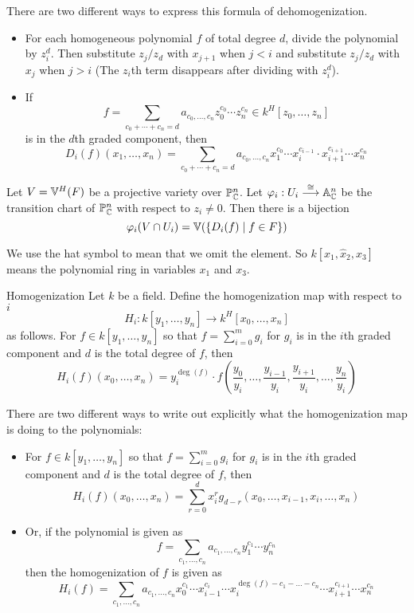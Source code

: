 \documentclass[a4paper]{article}
\begin{document}
There are two different ways to express this formula of dehomogenization. 
\begin{itemize}
\item For each homogeneous polynomial $f$ of total degree $d$, divide the polynomial by $z_i^d$. Then substitute $z_j/z_d$ with $x_{j+1}$ when $j<i$ and substitute $z_j/z_d$ with $x_j$ when $j>i$ (The $z_i$th term disappears after dividing with $z_i^d$). 
\item If $$f=\sum_{c_0+\cdots+c_n=d} a_{c_0,\dots,c_n}z_0^{c_0}\cdots z_n^{c_n}\in k^H[z_0,\dots,z_n]$$ is in the $d$th graded component, then $$D_i(f)(x_1,\dots,x_n)=\sum_{c_0+\cdots+c_n=d} a_{c_0,\dots,c_n}x_1^{c_0}\cdots x_i^{c_{i-1}}\cdot x_{i+1}^{c_{i+1}}\cdots x_n^{c_n}$$
\end{itemize}

\begin{prp}{}{} Let $V=\mathbb{V}^H(F)$ be a projective variety over $\mathbb{P}_{\mathbb{C}}^n$. Let $\varphi_i:U_i\overset{\cong}{\longrightarrow}\mathbb{A}_{\mathbb{C}}^n$ be the transition chart of $\mathbb{P}_{\mathbb{C}}^n$ with respect to $z_i\neq 0$. Then there is a bijection $$\varphi_i(V\cap U_i)=\mathbb{V}(\{D_i(f)\;|\;f\in F\})$$
\end{prp}

We use the hat symbol to mean that we omit the element. So $k[x_1,\hat{x}_2,x_3]$ means the polynomial ring in variables $x_1$ and $x_3$. 

\begin{defn}{Homogenization}{} Let $k$ be a field. Define the homogenization map with respect to $i$ $$H_i:k[y_1,\dots,y_n]\to k^H[x_0,\dots,x_n]$$ as follows. For $f\in k[y_1,\dots,y_n]$ so that $f=\sum_{i=0}^mg_i$ for $g_i$ is in the $i$th graded component and $d$ is the total degree of $f$, then $$H_i(f)(x_0,\dots,x_n)=y_i^{\deg(f)}\cdot f\left(\frac{y_0}{y_i},\dots,\frac{y_{i-1}}{y_i},\frac{y_{i+1}}{y_i},\dots,\frac{y_n}{y_i}\right)$$
\end{defn}

There are two different ways to write out explicitly what the homogenization map is doing to the polynomials: 
\begin{itemize}
\item For $f\in k[y_1,\dots,y_n]$ so that $f=\sum_{i=0}^mg_i$ for $g_i$ is in the $i$th graded component and $d$ is the total degree of $f$, then $$H_i(f)(x_0,\dots,x_n)=\sum_{r=0}^dx_i^rg_{d-r}(x_0,\dots,x_{i-1},x_i,\dots,x_n)$$ 
\item Or, if the polynomial is given as $$f=\sum_{c_1,\dots,c_n}a_{c_1,\dots,c_n}y_1^{c_1}\cdots y_n^{c_n}$$ then the homogenization of $f$ is given as $$H_i(f)=\sum_{c_1,\dots,c_n}a_{c_1,\dots,c_n}x_0^{c_1}\cdots x_{i-1}^{c_i}\cdots x_i^{\deg(f)-c_1-\dots-c_n}\cdots x_{i+1}^{c_{i+1}}\cdots x_n^{c_n}$$
\end{itemize}
\end{document}
